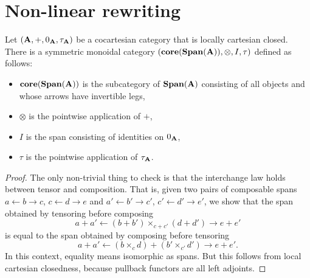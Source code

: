 \documentclass[master]{subfiles}
\begin{document}
         

\section{Non-linear rewriting} 
\label{sec_nonlinear-rewriting}


\begin{lem} \label{lem_IRewrite-obcat}
	Let $ (\mathbf{A} , + , 0_{\mathbf{A}} , \tau_{\mathbf{A}} ) $ be a cocartesian category that is locally cartesian closed. There is a symmetric monoidal category $ ( \mathbf{core} (\mathbf{Span} (\mathbf{A})) , \otimes , I , \tau ) $ defined as follows:
	\begin{itemize}
		\item $ \mathbf{core} (\mathbf{Span} (\mathbf{A})) $ is the subcategory of $ \mathbf{Span} (\mathbf{A}) $ consisting of all objects and whose arrows have invertible legs,
		\item $ \otimes $ is the pointwise application of $ + $,
		\item $ I $ is the span consisting of identities on $ 0_{\mathbf{A}} $,
		\item $ \tau $ is the pointwise application of $ \tau_{\mathbf{A}} $.
	\end{itemize}	
\end{lem}
\begin{proof}
	The only non-trivial thing to check is that the interchange law holds between tensor and composition.  That is, given two pairs of composable spans $ a \gets b \to c $, $ c \gets d \to e $ and $ a' \gets b' \to c' $, $ c' \gets d' \to e' $, we show that the span obtained by tensoring before composing 
	\[
	a + a' \gets
	(b + b') \times_{c + c'} (d + d') \to
	e + e'
	\]
	is equal to the span obtained by composing before tensoring
	\[
	a + a' \gets
	(b \times_{c} d) + (b' \times_{c'} d') \to
	e + e'.
	\]
	In this context, equality means isomorphic as spans. But this follows from local cartesian closedness, because pullback functors are all left adjoints.
\end{proof}
\end{document}
